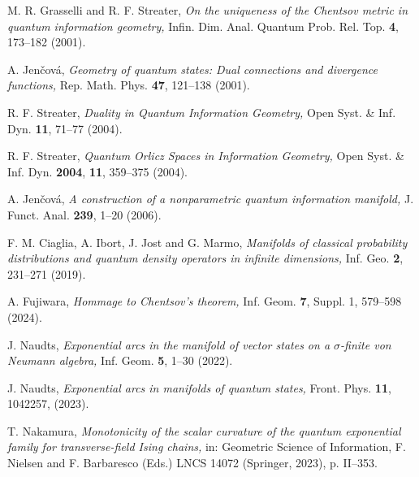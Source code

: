 \documentclass[a4paper,10pt]{article}
\begin{document}
\begin{thebibliography}{99}
M. R. Grasselli and R. F. Streater, {\em 
On the uniqueness of the Chentsov metric in quantum information geometry,}
Infin. Dim. Anal. Quantum Prob. Rel. Top. {\bf 4}, 173--182 (2001).

A. {Jen\v cov\'a}, {\em 
Geometry of quantum states: Dual connections and divergence functions,}
Rep. Math. Phys. {\bf 47}, 121--138 (2001).

R. F. Streater, {\em  
Duality in Quantum Information Geometry,}
Open Syst. {\&} Inf. Dyn. {\bf 11}, 71--77 (2004).

R. F. Streater, {\em  
Quantum Orlicz Spaces in Information Geometry,}
Open Syst. {\&} Inf. Dyn. {\bf 2004}, {\bf 11}, 359--375 (2004).


A. {Jen\v cov\'a}, {\em
A construction of a nonparametric quantum information manifold,}
J. Funct. Anal.  {\bf  239}, 1--20 (2006).

F. M. Ciaglia, A. Ibort, J. Jost and G. Marmo,
{\em 
Manifolds of classical probability distributions and
quantum density operators in infinite dimensions,}
Inf. Geo. {\bf 2}, 231--271 (2019).

A. Fujiwara, {\em
Hommage to Chentsov's theorem,}
Inf. Geom. {\bf 7}, Suppl. 1, 579--598 (2024).

J. Naudts, {\em
Exponential arcs in the manifold of vector states on a $\sigma$-finite von {N}eumann algebra,}
Inf. Geom. {\bf 5}, 1--30 (2022).

 J. Naudts, {\em
 Exponential arcs in manifolds of quantum states,}
Front. Phys. {\bf 11}, 1042257, (2023).

 T. Nakamura, {\em
Monotonicity of the scalar curvature of the quantum
exponential family for transverse-field Ising chains,}
in: Geometric Science of Information, F. Nielsen and F. Barbaresco (Eds.) 
LNCS 14072 (Springer, 2023),  p. II--353.

\end{thebibliography}
\end{document}
